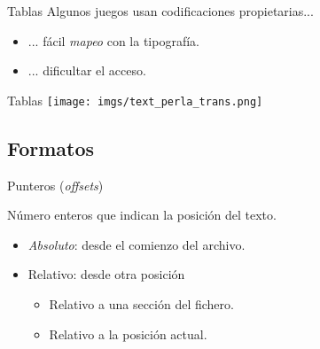 \begin{frame}{Tablas}
    Algunos juegos usan codificaciones propietarias...
    \begin{itemize}
        \item ... fácil \textit{mapeo} con la tipografía.
        \item ... dificultar el acceso.
    \end{itemize}
\end{frame}

\begin{frame}[t,fragile]{Tablas}
    \texttt{[image: imgs/text\_perla\_trans.png]}
    \footnotesize{}
\end{frame}

\subsection{Formatos}
\begin{frame}{Punteros (\textit{offsets})}
    \begin{block}{}
        \centering{}Número enteros que indican la posición del texto.
    \end{block}
    \vfill{}
    \begin{itemize}
        \item<3-> \textit{Absoluto}: desde el comienzo del archivo.
        \item<4-> Relativo: desde otra posición
        \begin{itemize}
            \item Relativo a una sección del fichero.
            \item Relativo a la posición actual.
        \end{itemize}
    \end{itemize}
\end{frame}

